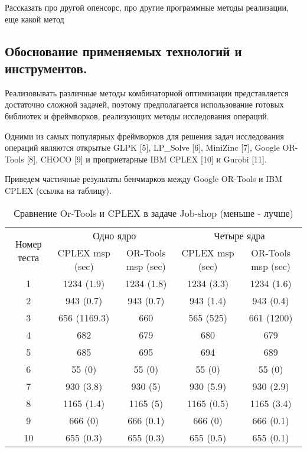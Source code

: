 Рассказать про другой опенсорс, про другие программные методы реализации, еще какой метод

\subsection{Обоснование применяемых технологий и инструментов.}
Реализовывать различные методы комбинаторной оптимизации представляется достаточно сложной задачей, поэтому предполагается использование готовых библиотек и фреймворков, реализующих методы исследования операций.

Одними из самых популярных фреймворков для решения задач исследования операций являются открытые GLPK [5], LP\_Solve [6], MiniZinc [7], Google OR-Tools [8], CHOCO [9] и проприетарные IBM CPLEX [10] и Gurobi [11].

Приведем частичные результаты бенчмарков между Google OR-Tools и IBM CPLEX (ссылка на таблицу).

\begin{table}[H]
	\caption{Сравнение Or-Tools и CPLEX в задаче Job-shop (меньше - лучше)}\label{vs}
	\begin{adjustbox}{width=1\textwidth}
		\begin{tabular}{|c|c|c|c|c|}
			\hline \multirow{2}{*}{Номер теста} & \multicolumn{2}{|c|}{Одно ядро} & \multicolumn{2}{|c|}{Четыре ядра} \\
			\cline{2-5} & CPLEX msp (sec) & OR-Tools msp (sec) & CPLEX msp (sec) & OR-Tools msp (sec) \\
			\hline 1 & 1234 (1.9) & 1234 (1.8) & 1234 (3.3) & 1234 (1.6) \\
			\hline 2 & 943 (0.7) & 943 (0.7) & 943 (1.4) & 943 (0.4) \\
			\hline 3 & 656 (1169.3) & 660 & 565 (525) & 661 (1200) \\
			\hline 4 & 682 & 679 & 680 & 679 \\
			\hline 5 & 685 & 695 & 694 & 689 \\
			\hline 6 & 55 (0) & 55 (0) & 55 (0) & 55 (0) \\
			\hline 7 & 930 (3.8) & 930 (5) & 930 (5.9) & 930 (2.9) \\
			\hline 8 & 1165  (1.4) & 1165 (5) & 1165 (0.5) & 1165 (3.4) \\
			\hline 9 & 666 (0) & 666 (0.1) & 666 (0) & 666 (0.1) \\
			\hline 10 & 655 (0.3) & 655 (0.3) & 655 (0.5) & 655 (0.1) \\
			\hline 
		\end{tabular}
	\end{adjustbox}
\end{table}

